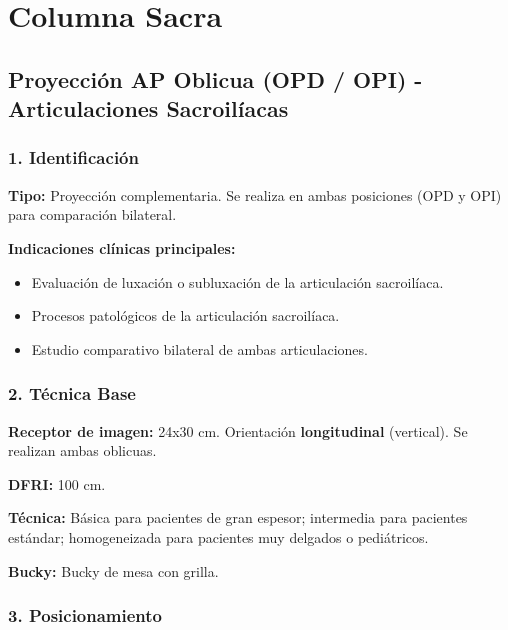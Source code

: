 	
		
		\section{Columna Sacra}
		
		\subsection{Proyección AP Oblicua (OPD / OPI) - Articulaciones Sacroilíacas}
		
		\subsubsection*{1. Identificación}
		
		\textbf{Tipo:} Proyección complementaria. Se realiza en ambas posiciones (OPD y OPI) para comparación bilateral.
		
		\textbf{Indicaciones clínicas principales:}
		\begin{itemize}
			\item Evaluación de luxación o subluxación de la articulación sacroilíaca.
			\item Procesos patológicos de la articulación sacroilíaca.
			\item Estudio comparativo bilateral de ambas articulaciones.
		\end{itemize}
		
		\subsubsection*{2. Técnica Base}
		
		\textbf{Receptor de imagen:} 24x30 cm. Orientación \textbf{longitudinal} (vertical). Se realizan ambas oblicuas.
		
		\textbf{DFRI:} 100 cm.
		
		\textbf{Técnica:} Básica para pacientes de gran espesor; intermedia para pacientes estándar; homogeneizada para pacientes muy delgados o pediátricos.
		
		\textbf{Bucky:} Bucky de mesa con grilla.
		
		\subsubsection*{3. Posicionamiento}
		
